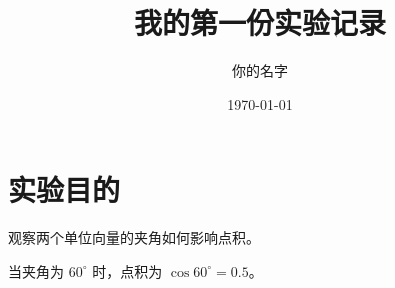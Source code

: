 \documentclass[UTF8,fontset=fandol,a4paper,12pt]{ctexart}
\title{我的第一份实验记录}
\author{你的名字}
\date{\today}
\begin{document}
\maketitle
\section{实验目的}
观察两个单位向量的夹角如何影响点积。

当夹角为 $60^\circ$ 时，点积为 $\cos 60^\circ=0.5$。
\end{document}
